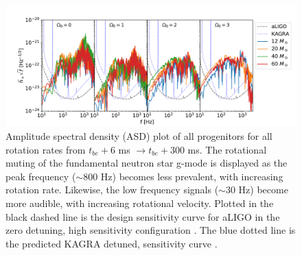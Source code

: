 \documentclass[twocolumn,times]{aastex62}  %
\begin{document}
\begin{figure}[t!]
  \centering     %
  \includegraphics[width=\textwidth]{figures/tbe6tbe300_M1_long.pdf}
  \caption{Amplitude spectral density (ASD) plot of all progenitors for all rotation rates from $t_{be}+6$ ms $\rightarrow t_{be}+300$ ms.  The rotational muting of the fundamental neutron star g-mode is displayed as the peak frequency ($\sim 800$ Hz) becomes less prevalent, with increasing rotation rate.  Likewise, the low frequency signals ($\sim30$ Hz) become more audible, with increasing rotational velocity.  Plotted in the black dashed line is the design sensitivity curve for aLIGO in the zero detuning, high sensitivity configuration \citep{barsotti:2018}.  The blue dotted line is the predicted KAGRA detuned, sensitivity curve \citep{komari:2017}.}
  \label{fig:spetra_long}
\end{figure}
\end{document}
